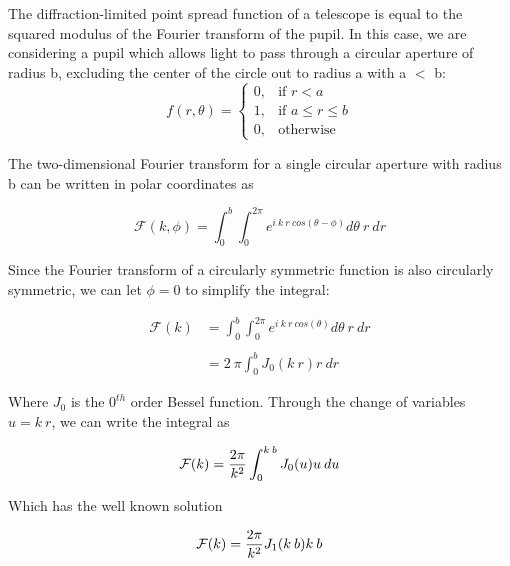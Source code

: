 \begin{answer}

The diffraction-limited point spread function of a telescope is equal
to the squared modulus of the Fourier transform of the pupil. In this
case, we are considering a pupil which allows light to pass through a
circular aperture of radius b, excluding the center of the circle out
to radius a with a $<$ b:
\begin{equation}
f(r,\theta)= 
\begin{cases}
   0,& \text{if } r < a\\
   1,& \text{if } a \leq r \leq b\\
    0,              & \text{otherwise}
\end{cases}
\end{equation}

The two-dimensional Fourier transform for a single circular aperture
with radius b can be written in polar coordinates as

\begin{equation}
\mathcal{F}(k,\phi)= \int_{0}^{b} \int_{0}^{2\pi} e^{i \: k \: r \: cos(\theta-\phi)} d\theta \: r \: dr
\end{equation}

\noindent Since the Fourier transform of a circularly symmetric function is also circularly symmetric, we can let $\phi=0$ to simplify the integral:

\begin{align*}
\mathcal{F}(k) &= \int_{0}^{b} \int_{0}^{2\pi} e^{i \: k \: r \: cos(\theta)} d\theta \: r \: dr \\ \\
&= 2 \: \pi \int_{0}^{b} J_0 (k \: r) r \: dr
\end{align*}

\noindent Where $J_0$ is the $0^{th}$ order Bessel function. Through the change of variables $u=k \: r$, we can  write the integral as 

\begin{equation}
\mathcal{F}(k) = \frac{2\pi}{k^2} \int_{0}^{k \: b} J_0 (u) u \: du \\ \\
\end{equation}

\noindent Which has the well known solution

\begin{equation}
\mathcal{F}(k) = \frac{2\pi}{k^2} J_1 (k \: b) k \: b  \\ \\
\end{equation}


\end{answer}

